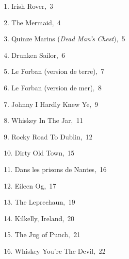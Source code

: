 \item\ 1. Irish Rover\hbox {, 3}
\item\ 2. The Mermaid\hbox {, 4}
\item\ 3. Quinze Marins (\textit  {Dead Man's Chest})\hbox {, 5}
\item\ 4. Drunken Sailor\hbox {, 6}
\item\ 5. Le Forban (version de terre)\hbox {, 7}
\item\ 6. Le Forban (version de mer)\hbox {, 8}
\item\ 7. Johnny I Hardly Knew Ye\hbox {, 9}
\item\ 8. Whiskey In The Jar\hbox {, 11}
\item\ 9. Rocky Road To Dublin\hbox {, 12}
\item\ 10. Dirty Old Town\hbox {, 15}
\item\ 11. Dans les prisons de Nantes\hbox {, 16}
\item\ 12. Eileen Og\hbox {, 17}
\item\ 13. The Leprechaun\hbox {, 19}
\item\ 14. Kilkelly, Ireland\hbox {, 20}
\item\ 15. The Jug of Punch\hbox {, 21}
\item\ 16. Whiskey You're The Devil\hbox {, 22}
